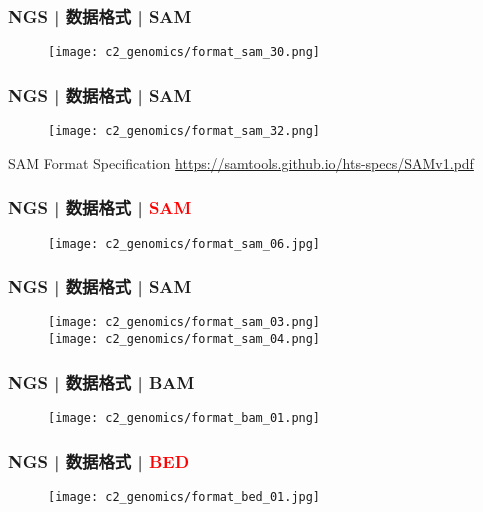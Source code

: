 \begin{frame}
  \frametitle{NGS | 数据格式 | SAM}
  \begin{figure}
    \centering
    \texttt{[image: c2\_genomics/format\_sam\_30.png]}
  \end{figure}
\end{frame}

\begin{frame}
  \frametitle{NGS | 数据格式 | SAM}
  \begin{figure}
    \centering
    \texttt{[image: c2\_genomics/format\_sam\_32.png]}
  \end{figure}
  \vspace{-0.8em}
  \begin{block}{SAM Format Specification}
    \href{https://samtools.github.io/hts-specs/SAMv1.pdf}{https://samtools.github.io/hts-specs/SAMv1.pdf}
  \end{block}
\end{frame}

\begin{frame}
  \frametitle{NGS | 数据格式 | \textcolor{red}{SAM}}
  \begin{figure}
    \centering
    \texttt{[image: c2\_genomics/format\_sam\_06.jpg]}
  \end{figure}
\end{frame}

\begin{frame}
  \frametitle{NGS | 数据格式 | SAM}
  \begin{figure}
    \centering
    \texttt{[image: c2\_genomics/format\_sam\_03.png]}\\
    \vspace{1em}
    \texttt{[image: c2\_genomics/format\_sam\_04.png]}
  \end{figure}
\end{frame}

\begin{frame}
  \frametitle{NGS | 数据格式 | BAM}
  \begin{figure}
    \centering
    \texttt{[image: c2\_genomics/format\_bam\_01.png]}
  \end{figure}
\end{frame}

\begin{frame}
  \frametitle{NGS | 数据格式 | \textcolor{red}{BED}}
  \begin{figure}
    \centering
    \texttt{[image: c2\_genomics/format\_bed\_01.jpg]}
  \end{figure}
\end{frame}

